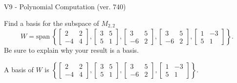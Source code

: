 \begin{exercise}
  \begin{exerciseTitle}V9 - Polynomial Computation (ver. 740)\end{exerciseTitle}
  \begin{exerciseStatement}
    Find a basis for the subspace of \(M_{2,2}\) 
\[W=\mathrm{span}\ \left\{\left[\begin{array}{cc}
2 & 2 \\
-4 & 4
\end{array}\right] , \left[\begin{array}{cc}
3 & 5 \\
5 & 1
\end{array}\right] , \left[\begin{array}{cc}
3 & 5 \\
-6 & 2
\end{array}\right] , \left[\begin{array}{cc}
3 & 5 \\
-6 & 2
\end{array}\right] , \left[\begin{array}{cc}
1 & -3 \\
5 & 1
\end{array}\right]\right\}.\]
 Be sure to explain why your result is a basis.


  \end{exerciseStatement}
  \begin{exerciseAnswer}
   A basis of \(W\) is  \(\left\{\left[\begin{array}{cc}
2 & 2 \\
-4 & 4
\end{array}\right] , \left[\begin{array}{cc}
3 & 5 \\
5 & 1
\end{array}\right] , \left[\begin{array}{cc}
3 & 5 \\
-6 & 2
\end{array}\right] , \left[\begin{array}{cc}
1 & -3 \\
5 & 1
\end{array}\right]\right\}\).
  


  \end{exerciseAnswer}
\end{exercise}